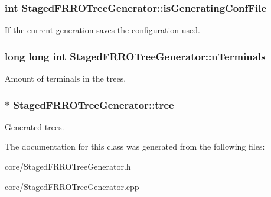 \subsubsection[{\texorpdfstring{is\+Generating\+Conf\+File}{isGeneratingConfFile}}]{\setlength{\rightskip}{0pt plus 5cm}int Staged\+F\+R\+R\+O\+Tree\+Generator\+::is\+Generating\+Conf\+File\hspace{0.3cm}{\ttfamily [private]}}\hypertarget{class_staged_f_r_r_o_tree_generator_a0b79edc4a184c376ab11260603004932}{}\label{class_staged_f_r_r_o_tree_generator_a0b79edc4a184c376ab11260603004932}
If the current generation saves the configuration used. 
\subsubsection[{\texorpdfstring{n\+Terminals}{nTerminals}}]{\setlength{\rightskip}{0pt plus 5cm}long long int Staged\+F\+R\+R\+O\+Tree\+Generator\+::n\+Terminals\hspace{0.3cm}{\ttfamily [private]}}\hypertarget{class_staged_f_r_r_o_tree_generator_a4b9c21f516630824f8057aae16f38918}{}\label{class_staged_f_r_r_o_tree_generator_a4b9c21f516630824f8057aae16f38918}
Amount of terminals in the trees. 
\subsubsection[{\texorpdfstring{tree}{tree}}]{$\ast$ Staged\+F\+R\+R\+O\+Tree\+Generator\+::tree\hspace{0.3cm}{\ttfamily [private]}}\hypertarget{class_staged_f_r_r_o_tree_generator_a3d7a0b0194b93d4c2706a21908ad9f09}{}\label{class_staged_f_r_r_o_tree_generator_a3d7a0b0194b93d4c2706a21908ad9f09}
Generated trees. 

The documentation for this class was generated from the following files\+:\begin{DoxyCompactItemize}
\item 
core/Staged\+F\+R\+R\+O\+Tree\+Generator.\+h\item 
core/Staged\+F\+R\+R\+O\+Tree\+Generator.\+cpp\end{DoxyCompactItemize}
